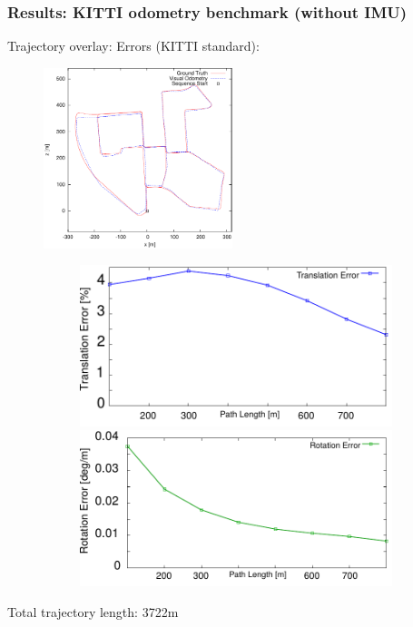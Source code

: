 \documentclass[11pt]{beamer}
\begin{document}
\begin{frame}
\frametitle{Results: KITTI odometry benchmark (without IMU)}
Trajectory overlay: \hfill Errors (KITTI standard): \hspace{25pt}
\begin{figure}[!htb]
\centering
\includegraphics[width=0.49\textwidth]{figures/results/00.pdf}\hspace{10pt}
\begin{subfigure}[b]{0.46\textwidth}
\includegraphics[width=\textwidth]{figures/results/00_tl.pdf}\\
\includegraphics[width=\textwidth]{figures/results/00_rl.pdf}
\end{subfigure}
\end{figure}
Total trajectory length: 3722m
\end{frame}
\end{document}
